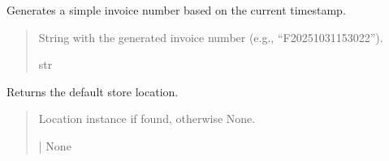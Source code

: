 \documentclass[a4paper,11pt,spanish]{sphinxmanual}
\begin{document}

\begin{fulllineitems}
\label{\detokenize{api/sale/sale.services:sale.services.generate_invoice_number}}
\pysigstartsignatures
\pysiglinewithargsret
{}
{}
{}
\pysigstopsignatures
\sphinxAtStartPar
Generates a simple invoice number based on the current timestamp.
\begin{quote}\begin{description}
\sphinxAtStartPar
String with the generated invoice number (e.g., “F20251031153022”).

\sphinxAtStartPar
str

\end{description}\end{quote}

\end{fulllineitems}


\begin{fulllineitems}
\label{\detokenize{api/sale/sale.services:sale.services.get_store_location}}
\pysigstartsignatures
\pysiglinewithargsret
{}
{}
{}
\pysigstopsignatures
\sphinxAtStartPar
Returns the default store location.
\begin{quote}\begin{description}
\sphinxAtStartPar
Location instance if found, otherwise None.

\sphinxAtStartPar
{\hyperref[\detokenize{api/inventory/inventory.models:inventory.models.Location}]{}} | None

\end{description}\end{quote}

\end{fulllineitems}

\end{document}
